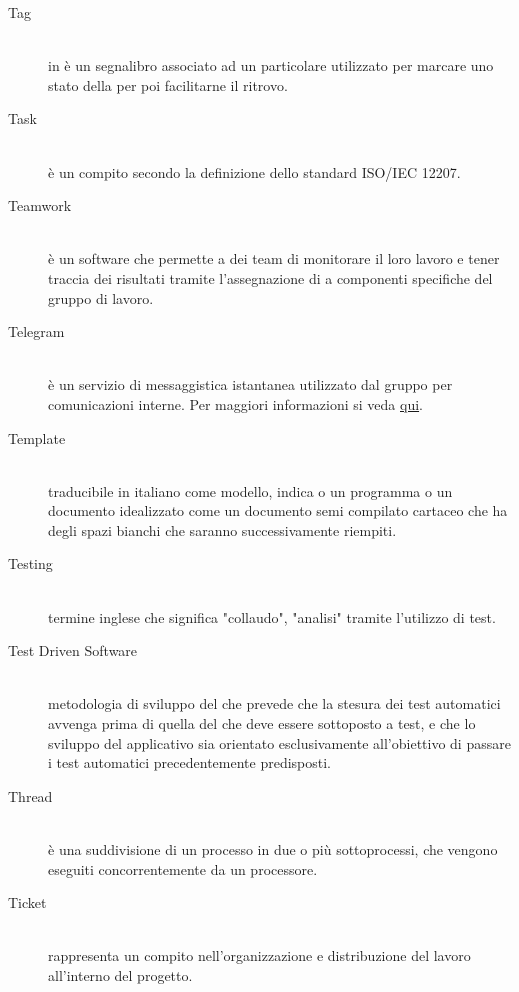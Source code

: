 \documentclass[12pt,a4paper]{article}
\begin{document}
\begin{description}
\item[Tag] 
\hfill\\in {} è un segnalibro associato ad un particolare  utilizzato per marcare uno stato della  per poi facilitarne il ritrovo.

\item[Task] 
\hfill\\è un compito secondo la definizione dello standard ISO/IEC 12207.

\item[Teamwork] 
\hfill\\è un software che permette a dei team di monitorare il loro lavoro e tener traccia dei risultati tramite l'assegnazione di  a componenti specifiche del gruppo di lavoro.

\item[Telegram] 
\hfill\\è un servizio di messaggistica istantanea utilizzato dal gruppo per comunicazioni interne. Per maggiori informazioni si veda \href{https://it.wikipedia.org/wiki/Telegram_(software)}{qui}.

\item[Template] 
\hfill\\traducibile in italiano come modello, indica o un programma o un documento idealizzato come un documento semi compilato cartaceo che ha degli spazi bianchi che saranno successivamente riempiti.



\item[Testing] 
\hfill\\ termine inglese che significa "collaudo", "analisi" tramite l'utilizzo di test.


\item[Test Driven Software] 
\hfill\\ metodologia di sviluppo del  che prevede che la stesura dei test automatici avvenga prima di quella del  che deve essere sottoposto a  test, e che lo sviluppo del  applicativo sia orientato esclusivamente all'obiettivo di passare i test automatici precedentemente predisposti.

\item[Thread] 
\hfill\\è una suddivisione di un processo in due o più sottoprocessi, che vengono eseguiti concorrentemente da un processore.

\item[Ticket] 
\hfill\\rappresenta un compito nell'organizzazione e distribuzione del lavoro all'interno del progetto.


\end{description}
\end{document}
